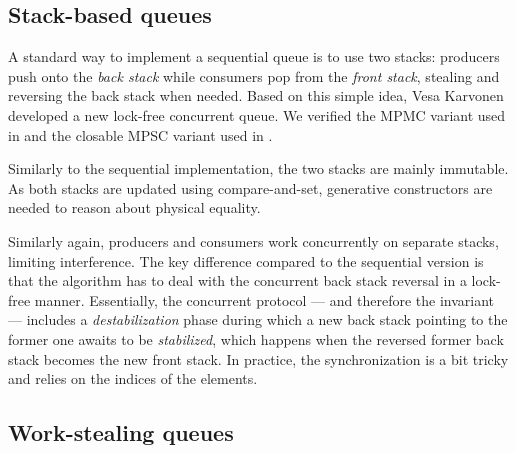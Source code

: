 \subsection{Stack-based queues}

A standard way to implement a sequential queue is to use two stacks: producers push onto the \emph{back stack} while consumers pop from the \emph{front stack}, stealing and reversing the back stack when needed.
Based on this simple idea, Vesa Karvonen developed a new lock-free concurrent queue.
We verified the MPMC variant used in \Picos and the closable MPSC variant used in \Picos.

Similarly to the sequential implementation, the two stacks are mainly immutable.
As both stacks are updated using compare-and-set, generative constructors are needed to reason about physical equality.

Similarly again, producers and consumers work concurrently on separate stacks, limiting interference.
The key difference compared to the sequential version is that the algorithm has to deal with the concurrent back stack reversal in a lock-free manner.
Essentially, the concurrent protocol --- and therefore the \Iris invariant --- includes a \emph{destabilization} phase during which a new back stack pointing to the former one awaits to be \emph{stabilized}, which happens when the reversed former back stack becomes the new front stack.
In practice, the synchronization is a bit tricky and relies on the indices of the elements.

\subsection{Work-stealing queues}
\label{sec:ws_queue}





